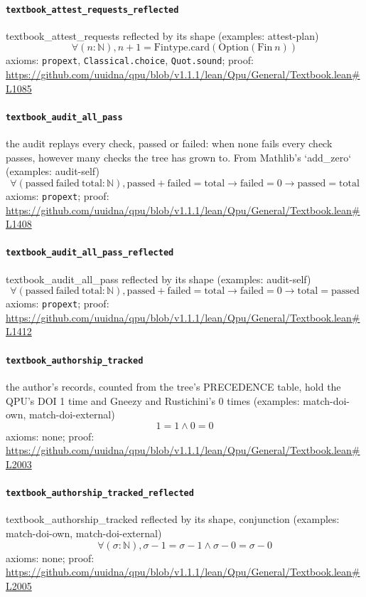 \documentclass[11pt]{article}
\begin{document}
\paragraph{\texttt{textbook\_attest\_requests\_reflected}}
textbook\_attest\_requests reflected by its shape (examples: attest-plan)
\[ \forall (n : \mathbb{N}), n + 1 = \mathrm{Fintype.card} (\mathrm{Option} (\mathrm{Fin}\ n)) \]
\noindent axioms: \texttt{propext}, \texttt{Classical.choice}, \texttt{Quot.sound}; proof: \url{https://github.com/uuidna/qpu/blob/v1.1.1/lean/Qpu/General/Textbook.lean\#L1085}

\paragraph{\texttt{textbook\_audit\_all\_pass}}
the audit replays every check, passed or failed: when none fails every check passes, however many checks the tree has grown to. From Mathlib's `add\_zero` (examples: audit-self)
\[ \forall (\mathrm{passed}\ \mathrm{failed}\ \mathrm{total} : \mathbb{N}), \mathrm{passed} + \mathrm{failed} = \mathrm{total} \to \mathrm{failed} = 0 \to \mathrm{passed} = \mathrm{total} \]
\noindent axioms: \texttt{propext}; proof: \url{https://github.com/uuidna/qpu/blob/v1.1.1/lean/Qpu/General/Textbook.lean\#L1408}

\paragraph{\texttt{textbook\_audit\_all\_pass\_reflected}}
textbook\_audit\_all\_pass reflected by its shape (examples: audit-self)
\[ \forall (\mathrm{passed}\ \mathrm{failed}\ \mathrm{total} : \mathbb{N}), \mathrm{passed} + \mathrm{failed} = \mathrm{total} \to \mathrm{failed} = 0 \to \mathrm{total} = \mathrm{passed} \]
\noindent axioms: \texttt{propext}; proof: \url{https://github.com/uuidna/qpu/blob/v1.1.1/lean/Qpu/General/Textbook.lean\#L1412}

\paragraph{\texttt{textbook\_authorship\_tracked}}
the author's records, counted from the tree's PRECEDENCE table, hold the QPU's DOI 1 time and Gneezy and Rustichini's 0 times (examples: match-doi-own, match-doi-external)
\[ 1 = 1 \land 0 = 0 \]
\noindent axioms: none; proof: \url{https://github.com/uuidna/qpu/blob/v1.1.1/lean/Qpu/General/Textbook.lean\#L2003}

\paragraph{\texttt{textbook\_authorship\_tracked\_reflected}}
textbook\_authorship\_tracked reflected by its shape, conjunction (examples: match-doi-own, match-doi-external)
\[ \forall (\sigma : \mathbb{N}), \sigma - 1 = \sigma - 1 \land \sigma - 0 = \sigma - 0 \]
\noindent axioms: none; proof: \url{https://github.com/uuidna/qpu/blob/v1.1.1/lean/Qpu/General/Textbook.lean\#L2005}
\end{document}
